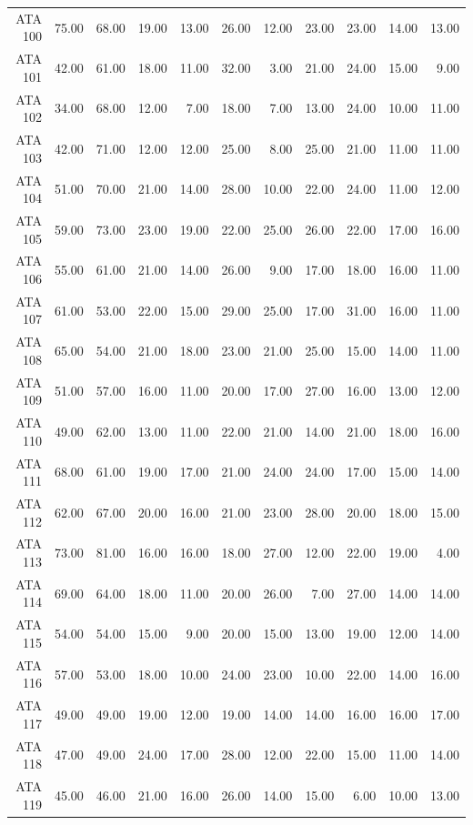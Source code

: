 \begin{landscape}
\begin{longtable}{rrrrrrrrrrr}
  ATA 100 & 75.00 & 68.00 & 19.00 & 13.00 & 26.00 & 12.00 & 23.00 & 23.00 & 14.00 & 13.00 \\ 
  ATA 101 & 42.00 & 61.00 & 18.00 & 11.00 & 32.00 & 3.00 & 21.00 & 24.00 & 15.00 & 9.00 \\ 
  ATA 102 & 34.00 & 68.00 & 12.00 & 7.00 & 18.00 & 7.00 & 13.00 & 24.00 & 10.00 & 11.00 \\ 
  ATA 103 & 42.00 & 71.00 & 12.00 & 12.00 & 25.00 & 8.00 & 25.00 & 21.00 & 11.00 & 11.00 \\ 
  ATA 104 & 51.00 & 70.00 & 21.00 & 14.00 & 28.00 & 10.00 & 22.00 & 24.00 & 11.00 & 12.00 \\ 
  ATA 105 & 59.00 & 73.00 & 23.00 & 19.00 & 22.00 & 25.00 & 26.00 & 22.00 & 17.00 & 16.00 \\ 
  ATA 106 & 55.00 & 61.00 & 21.00 & 14.00 & 26.00 & 9.00 & 17.00 & 18.00 & 16.00 & 11.00 \\ 
  ATA 107 & 61.00 & 53.00 & 22.00 & 15.00 & 29.00 & 25.00 & 17.00 & 31.00 & 16.00 & 11.00 \\ 
  ATA 108 & 65.00 & 54.00 & 21.00 & 18.00 & 23.00 & 21.00 & 25.00 & 15.00 & 14.00 & 11.00 \\ 
  ATA 109 & 51.00 & 57.00 & 16.00 & 11.00 & 20.00 & 17.00 & 27.00 & 16.00 & 13.00 & 12.00 \\ 
  ATA 110 & 49.00 & 62.00 & 13.00 & 11.00 & 22.00 & 21.00 & 14.00 & 21.00 & 18.00 & 16.00 \\ 
  ATA 111 & 68.00 & 61.00 & 19.00 & 17.00 & 21.00 & 24.00 & 24.00 & 17.00 & 15.00 & 14.00 \\ 
  ATA 112 & 62.00 & 67.00 & 20.00 & 16.00 & 21.00 & 23.00 & 28.00 & 20.00 & 18.00 & 15.00 \\ 
  ATA 113 & 73.00 & 81.00 & 16.00 & 16.00 & 18.00 & 27.00 & 12.00 & 22.00 & 19.00 & 4.00 \\ 
  ATA 114 & 69.00 & 64.00 & 18.00 & 11.00 & 20.00 & 26.00 & 7.00 & 27.00 & 14.00 & 14.00 \\ 
  ATA 115 & 54.00 & 54.00 & 15.00 & 9.00 & 20.00 & 15.00 & 13.00 & 19.00 & 12.00 & 14.00 \\ 
  ATA 116 & 57.00 & 53.00 & 18.00 & 10.00 & 24.00 & 23.00 & 10.00 & 22.00 & 14.00 & 16.00 \\ 
  ATA 117 & 49.00 & 49.00 & 19.00 & 12.00 & 19.00 & 14.00 & 14.00 & 16.00 & 16.00 & 17.00 \\ 
  ATA 118 & 47.00 & 49.00 & 24.00 & 17.00 & 28.00 & 12.00 & 22.00 & 15.00 & 11.00 & 14.00 \\ 
  ATA 119 & 45.00 & 46.00 & 21.00 & 16.00 & 26.00 & 14.00 & 15.00 & 6.00 & 10.00 & 13.00 \\ 

\end{longtable}
\end{landscape}
